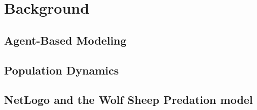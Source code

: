 
\section{Background}\label{sec:Background}

    \subsection{Agent-Based Modeling}
        \label{sec:ABM}

    \subsection{Population Dynamics}
        \label{sec:Population Dynamics}

    \subsection{NetLogo and the Wolf Sheep Predation model}
        \label{sec:NetLogo WSP}